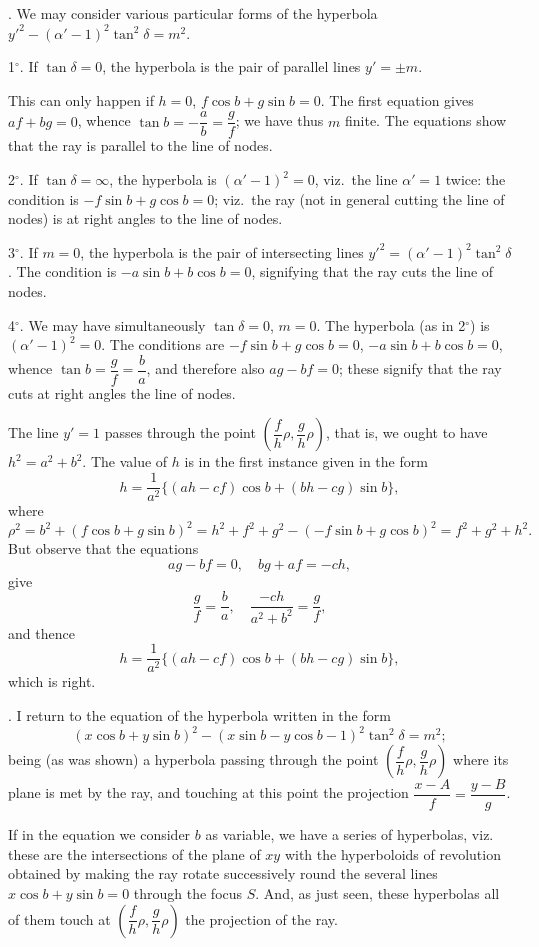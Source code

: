 \documentclass[11pt,a4paper]{article}
\theoremstyle{definition}
\begin{document}
\newpage
{}. We may consider various particular forms of the hyperbola $y'^2 - (\alpha'-1)^2\tan^2\delta = m^2$.

1$^\circ$. If $\tan\delta=0$, the hyperbola is the pair of parallel lines $y'=\pm m$.

This can only happen if $h=0$, $f\cos b+g\sin b=0$. The first equation gives $af+bg=0$,
whence $\tan b=-\dfrac{a}{b}=\dfrac{g}{f}$; we have thus $m$ finite. The equations show that the ray is parallel
to the line of nodes.

2$^\circ$. If $\tan\delta=\infty$, the hyperbola is $(\alpha'-1)^2=0$, viz.~the line $\alpha'=1$ twice: the
condition is $-f\sin b+g\cos b=0$; viz.~the ray (not in general cutting the line of nodes)
is at right angles to the line of nodes.

3$^\circ$. If $m=0$, the hyperbola is the pair of intersecting lines $y'^2=(\alpha'-1)^2\tan^2\delta$.
The condition is $-a\sin b+b\cos b=0$, signifying that the ray cuts the line of nodes.

4$^\circ$. We may have simultaneously $\tan\delta=0$, $m=0$. The hyperbola (as in 2$^\circ$) is
$(\alpha'-1)^2=0$. The conditions are $-f\sin b+g\cos b=0$, $-a\sin b+b\cos b=0$, whence
$\tan b=\dfrac{g}{f}=\dfrac{b}{a}$, and therefore also $ag-bf=0$; these signify that the ray cuts at right
angles the line of nodes.

The line $y'=1$ passes through the point $\left(\dfrac{f}{h}\rho, \dfrac{g}{h}\rho\right)$, that is, we ought to have
$h^2=a^2+b^2$. The value of $h$ is in the first instance given in the form
\[
h = \frac{1}{a^2}\{(ah-cf)\cos b + (bh-cg)\sin b\},
\]
where
\[
\rho^2 = b^2 + (f\cos b+g\sin b)^2 = h^2 + f^2+g^2-(-f\sin b+g\cos b)^2 = f^2+g^2+h^2.
\]
But observe that the equations
\[
ag-bf=0, \quad bg+af=-ch,
\]
give
\[
\frac{g}{f} = \frac{b}{a}, \quad \frac{-ch}{a^2+b^2} = \frac{g}{f},
\]
and thence
\[
h = \frac{1}{a^2}\{(ah-cf)\cos b + (bh-cg)\sin b\},
\]
which is right.

\newpage
{}. I return to the equation of the hyperbola written in the form
\[
(x\cos b + y\sin b)^2 - (x\sin b - y\cos b - 1)^2\tan^2\delta = m^2;
\]
being (as was shown) a hyperbola passing through the point $\left(\dfrac{f}{h}\rho, \dfrac{g}{h}\rho\right)$ where its plane
is met by the ray, and touching at this point the projection $\dfrac{x-A}{f}=\dfrac{y-B}{g}$.

If in the equation we consider $b$ as variable, we have a series of hyperbolas, viz.~
these are the intersections of the plane of $xy$ with the hyperboloids of revolution obtained
by making the ray rotate successively round the several lines $x\cos b+y\sin b=0$
through the focus $S$. And, as just seen, these hyperbolas all of them touch at
$\left(\dfrac{f}{h}\rho, \dfrac{g}{h}\rho\right)$ the projection of the ray.
\end{document}
